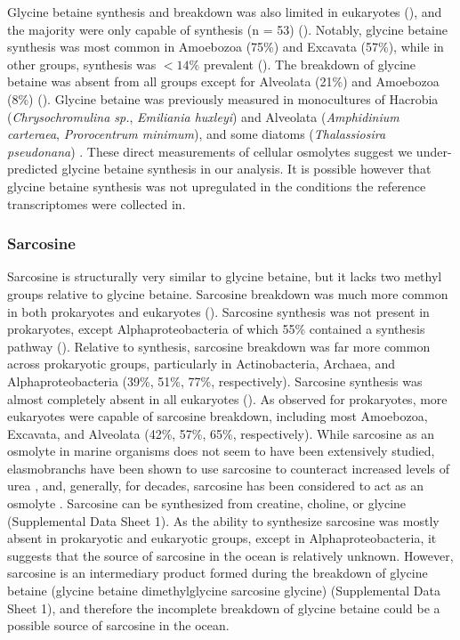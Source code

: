 \documentclass[utf8]{frontiersSCNS} %
\begin{document}
Glycine betaine synthesis and breakdown was also limited in eukaryotes (), and the majority were only capable of synthesis (n = 53) (). Notably, glycine betaine synthesis was most common in Amoebozoa (75\%) and Excavata (57\%), while in other groups, synthesis was $< 14\%$ prevalent (). The breakdown of glycine betaine was absent from all groups except for Alveolata (21\%) and Amoebozoa (8\%) (). Glycine betaine was previously measured in monocultures of Hacrobia (\textit{Chrysochromulina sp.}, \textit{Emiliania huxleyi}) and Alveolata (\textit{Amphidinium carteraea}, \textit{Prorocentrum minimum}), and some diatoms (\textit{Thalassiosira pseudonana}) \citep{Gebser2013,Keller1999,Keller1999.2}. These direct measurements of cellular osmolytes suggest we under-predicted glycine betaine synthesis in our analysis. It is possible however that glycine betaine synthesis was not upregulated in the conditions the reference transcriptomes were collected in. 

\subsubsection*{Sarcosine}
Sarcosine is structurally very similar to glycine betaine, but it lacks two methyl groups relative to glycine betaine. Sarcosine breakdown was much more common in both prokaryotes and eukaryotes (). Sarcosine synthesis was not present in prokaryotes, except Alphaproteobacteria of which 55\% contained a synthesis pathway (). Relative to synthesis, sarcosine breakdown was far more common across prokaryotic groups, particularly in Actinobacteria, Archaea, and Alphaproteobacteria (39\%, 51\%, 77\%, respectively). Sarcosine synthesis was almost completely absent in all eukaryotes (). As observed for prokaryotes, more eukaryotes were capable of sarcosine breakdown, including most Amoebozoa, Excavata, and Alveolata (42\%, 57\%, 65\%, respectively). While sarcosine as an osmolyte in marine organisms does not seem to have been extensively studied, elasmobranchs have been shown to use sarcosine to counteract increased levels of urea \citep{Treberg2006}, and, generally, for decades, sarcosine has been considered to act as an osmolyte \citep{Arakawa1985}. Sarcosine can be synthesized from creatine, choline, or glycine (Supplemental Data Sheet 1). As the ability to synthesize sarcosine was mostly absent in prokaryotic and eukaryotic groups, except in Alphaproteobacteria, it suggests that the source of sarcosine in the ocean is relatively unknown. However, sarcosine is an intermediary product formed during the breakdown of glycine betaine (glycine betaine \textrightarrow dimethylglycine \textrightarrow  sarcosine \textrightarrow glycine) (Supplemental Data Sheet 1), and therefore the incomplete breakdown of glycine betaine could be a possible source of sarcosine in the ocean.
\end{document}
